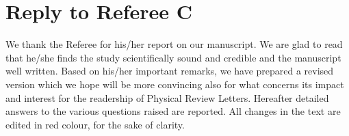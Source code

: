 \documentclass[12pt,english]{article}
\begin{document}


\section*{Reply to Referee C}
We thank the Referee for his/her report on our manuscript.
We are glad to read that he/she finds the study scientifically sound and credible and 
the manuscript well written. Based on his/her important remarks, we have 
prepared a revised version which we hope will be more convincing also for what concerns
its impact and interest for the readership of Physical Review Letters.
Hereafter detailed answers to the various questions raised are reported. All changes 
in the text are edited in red colour, for the sake of clarity.
\end{document}
